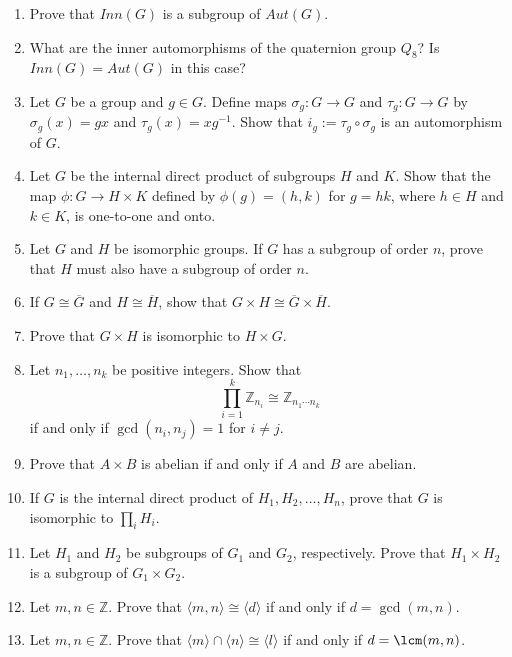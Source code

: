 {\begin{enumerate}[(1)]
\item
Prove that $Inn(G)$ is a subgroup of $Aut(G)$.
 
\item
What are the inner automorphisms of the quaternion group $Q_8$? Is
$Inn(G) = Aut(G)$ in this case? 
 
\item
Let $G$ be a group and $g \in G$.  Define maps $\sigma_g :G
\rightarrow G$ and $\tau_g :G \rightarrow G$\label{noterightreg}
 by $\sigma_g(x) = gx$
and $\tau_g(x) = xg^{-1}$. Show that $i_g := \tau_g \circ \sigma_g$ is
an automorphism of $G$. 
 

\item
Let $G$ be the internal direct product of subgroups $H$ and $K$.  Show
that the map $\phi : G \rightarrow H \times K$ defined by  $\phi(g) =
(h,k)$ for $g =hk$,  where $h \in H$ and  $k \in K$, is one-to-one and
onto. 
 

\item
Let $G$ and $H$ be isomorphic groups. If $G$ has a subgroup of order
$n$, prove that $H$ must also have a subgroup of  order $n$.
 

\item
If $G \cong \overline{G}$ and $H \cong \overline{H}$, show that $G
\times H \cong \overline{G} \times \overline{H}$.
 

\item
Prove that $G \times H$ is isomorphic to $H \times G$.
 

\item
Let $n_1, \ldots, n_k$ be positive integers. Show that
\[
\prod_{i=1}^k {\mathbb Z}_{n_i} \cong {\mathbb Z}_{n_1 \cdots n_k}
\]
if and only if $\gcd( n_i, n_j) =1$ for $i \neq j$.
 

\item
Prove that $A \times B$ is abelian if and only if $A$ and $B$ are
abelian. 
 

\item
If $G$ is the internal direct product of $H_1, H_2, \ldots, H_n$,
prove that $G$ is isomorphic to $\prod_i H_i$. 
 

\item
Let $H_1$ and $H_2$ be subgroups of $G_1$ and $G_2$, respectively. Prove that $H_1 \times H_2$ is a subgroup of $G_1 \times G_2$. 
 

\item
Let $m, n \in {\mathbb Z}$. Prove that $\langle m,n \rangle \cong \langle d \rangle$ if and only if $d = \gcd(m,n)$.
 

\item
Let $m, n \in {\mathbb Z}$. Prove that $\langle m \rangle \cap \langle n \rangle \cong \langle l \rangle$ if and only if $d = \lcm(m,n)$. 
 
\end{enumerate}
}